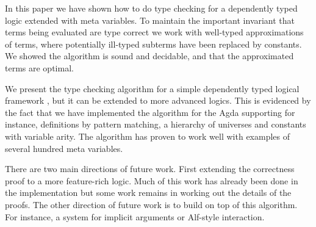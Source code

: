 
In this paper we have shown how to do type checking for a dependently typed
logic extended with meta variables. To maintain the important invariant that
terms being evaluated are type correct we work with well-typed approximations
of terms, where potentially ill-typed subterms have been replaced by constants.
We showed the algorithm is sound and decidable, and that the approximated terms
are optimal.

We present the type checking algorithm for a simple dependently typed logical
framework {\Core}, but it can be extended to more advanced logics.  This is
evidenced by the fact that we have implemented the algorithm for the
Agda supporting for instance, definitions by pattern matching,
a hierarchy of universes and constants with variable arity. The algorithm has
proven to work well with examples of several hundred meta variables.

There are two main directions of future work. First extending the correctness
proof to a more feature-rich logic. Much of this work has already been done
in the implementation but some work remains in working out the details of the
proofs. The other direction of future work is to build on top of this
algorithm. For instance, a system for implicit arguments or Alf-style
interaction.

